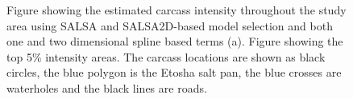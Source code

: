 \documentclass[letterpaper]{interact}
\begin{document}
\begin{figure}[!ht]
     \centering
     \begin{subfloat}[]{%
    }
    \hspace{1pt}
     \end{subfloat}
     \begin{subfloat}[]{%
    }
    \hspace{5pt}
     \end{subfloat}
     \caption{Figure showing the estimated carcass intensity throughout the study area using SALSA and SALSA2D-based model selection and both one and two dimensional spline based terms (a). Figure showing the top 5\% intensity areas. The carcass locations are shown as black circles, the blue polygon is the Etosha salt pan, the blue crosses are waterholes and the black lines are roads.}
\label{fig:mikeoutputs}
\end{figure}
\end{document}
